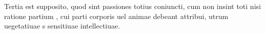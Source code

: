\documentclass{article}
\begin{document}
\makeatletter

















\begin{ledgroup}
\beginnumbering


\pstart
{} Tertia est  supposito, quod sint passiones totius coniuncti, cum non insint toti nisi ratione partium , cui parti corporis uel animae debeant attribui,  utrum uegetatiuae  s  sensitiuae 
intellectiuae.


\pend

\endnumbering
 \end{ledgroup}
\end{document}
